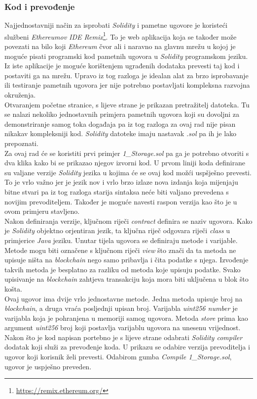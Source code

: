 \documentclass[times, utf8, zavrsni]{fer}
\begin{document}
\subsubsection{Kod i prevođenje}
Najjednostavniji način za isprobati \emph{Solidity} i pametne ugovore je koristeći službeni \emph{Ethereumov IDE Remix}\footnote{\url{https://remix.ethereum.org/}}. 
To je web aplikacija koja se također može povezati na bilo koji \emph{Ethereum} čvor ali i naravno na glavnu mrežu u kojoj je moguće pisati programski kod
pametnih ugovora u \emph{Solidity} programskom jeziku. Iz iste aplikacije je moguće korištenjem ugrađenih dodataka prevesti taj kod i postaviti ga na mrežu.
Upravo iz tog razloga je idealan alat za brzo isprobavanje ili testiranje pametnih ugovora jer nije potrebno postavljati kompleksna razvojna okruženja. \\
Otvaranjem početne stranice, s lijeve strane je prikazan pretražitelj datoteka. Tu se nalazi nekoliko jednostavnih primjera pametnih ugovora koji su dovoljni
za demonstriranje samog toka događaja pa iz tog razloga za ovaj rad nije pisan nikakav kompleksniji kod. \emph{Solidity} datoteke imaju nastavak \emph{.sol}
pa ih je lako prepoznati. \\
Za ovaj rad će se koristiti prvi primjer \emph{1\_Storage.sol} pa ga je potrebno otvoriti s dva klika kako bi se prikazao njegov izvorni kod.
U prvom liniji koda definirane su valjane verzije \emph{Solidity} jezika u kojima će se ovaj kod možći uspšješno prevesti. To je vrlo važno jer je jezik
nov i vrlo brzo izlaze nova izdanja koja mijenjaju bitne stvari pa iz tog razloga starija sintaksa neće biti valjano prevedena s novijim prevoditeljem. Također je moguće
navesti raspon verzija kao što je u ovom primjeru stavljeno. \\
Nakon definiranja verzije, ključnom riječi \emph{contract} definira se naziv ugovora. Kako je \emph{Solidity} objektno orjentiran jezik, ta ključna riječ odgovara 
riječi \emph{class} u primjerice \emph{Java} jeziku. Unutar tijela ugovora se definiraju metode i varijable. Metode mogu biti označene s ključnom riječi \emph{view} što
znači da ta metoda ne upisuje ništa na \emph{blockchain} nego samo pribavlja i čita podatke s njega. Izvođenje takvih metoda je besplatno za razliku od metoda koje
upisuju podatke. Svako upisivanje na \emph{blockchain} zahtjeva transakciju koja mora biti uključena u blok što košta. \\
Ovaj ugovor ima dvije vrlo jednostavne metode. Jedna metoda upisuje broj na \emph{blockchain}, a druga vraća posljednji upisan broj. 
Varijabla \emph{uint256 number} je varijabla koja je pohranjena u memoriji samog ugovora. Metoda \emph{store} prima kao argument \emph{uint256} broj koji postavlja 
varijablu ugovora na unesenu vrijednost. \\
Nakon što je kod napisan portebno je s lijeve strane odabrati \emph{Solidity compiler} dodatak koji služi za prevođenje koda. U prikazu se odabire verzija prevoditelja
i ugovor koji korisnik želi prevesti. Odabirom gumba \emph{Compile 1\_Storage.sol}, ugovor je uspješno preveden.
\end{document}
